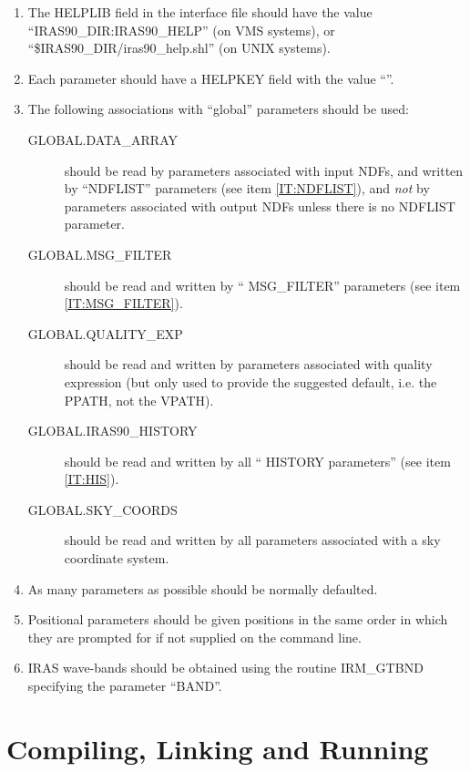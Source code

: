 \begin{enumerate}
\item The {\small HELPLIB} field in the interface file should have the value
``{\small IRAS90\_DIR:IRAS90\_HELP}'' (on {\small VMS} systems), or 
``{\small \$IRAS90\_DIR/iras90\_help.shl}'' (on {\small UNIX} systems).

\item Each parameter should have a {\small HELPKEY} field with the value 
``\lsk''.

\item The following associations with ``global'' parameters should be used:
\begin{description}
\item [GLOBAL.DATA\_ARRAY ] should be read by parameters associated with input
{\small NDF}s, and written by ``{\small NDFLIST}'' parameters (see item
\ref{IT:NDFLIST}), and {\em not} by parameters associated with output {\small
NDF}s unless there is no {\small NDFLIST} parameter. 
\item [GLOBAL.MSG\_FILTER ] should be read and written by ``{\small 
MSG\_FILTER}'' parameters (see item \ref{IT:MSG_FILTER}).
\item [GLOBAL.QUALITY\_EXP ] should be read and written by parameters associated
with quality expression (but only used to provide the suggested default, i.e.
the {\small PPATH}, not the {\small VPATH}). 
\item [GLOBAL.IRAS90\_HISTORY] should be read and written by all ``{\small 
HISTORY} parameters'' (see item \ref{IT:HIS}).
\item [GLOBAL.SKY\_COORDS] should be read and written by all parameters 
associated with a sky coordinate system.
\end{description}

\item As many parameters as possible should be normally defaulted.

\item Positional parameters should be given positions in the same order in which
they are prompted for if not supplied on the command line. 

\item {\small IRAS} wave-bands should be obtained using the routine {\small
IRM\_GTBND} specifying the parameter ``{\small BAND}''. 

\end{enumerate}

\section{Compiling, Linking and Running}
